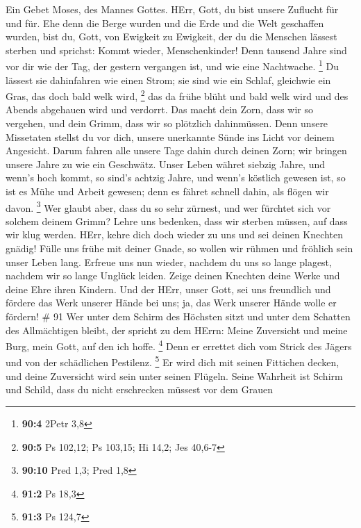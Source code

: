  Ein Gebet Moses, des Mannes Gottes. HErr, Gott, du bist
unsere Zuflucht für und für.  Ehe denn die Berge wurden und
die Erde und die Welt geschaffen wurden, bist du, Gott, von Ewigkeit zu
Ewigkeit,  der du die Menschen lässest sterben und sprichst:
Kommt wieder, Menschenkinder!  Denn tausend Jahre sind vor
dir wie der Tag, der gestern vergangen ist, und wie eine Nachtwache.
\footnote{\textbf{90:4} 2Petr 3,8}  Du lässest sie
dahinfahren wie einen Strom; sie sind wie ein Schlaf, gleichwie ein
Gras, das doch bald welk wird, \footnote{\textbf{90:5} Ps 102,12; Ps
  103,15; Hi 14,2; Jes 40,6-7}  das da frühe blüht und bald
welk wird und des Abends abgehauen wird und verdorrt.  Das
macht dein Zorn, dass wir so vergehen, und dein Grimm, dass wir so
plötzlich dahinmüssen.  Denn unsere Missetaten stellst du
vor dich, unsere unerkannte Sünde ins Licht vor deinem Angesicht.
 Darum fahren alle unsere Tage dahin durch deinen Zorn; wir
bringen unsere Jahre zu wie ein Geschwätz.  Unser Leben
währet siebzig Jahre, und wenn's hoch kommt, so sind's achtzig Jahre,
und wenn's köstlich gewesen ist, so ist es Mühe und Arbeit gewesen; denn
es fähret schnell dahin, als flögen wir davon. \footnote{\textbf{90:10}
  Pred 1,3; Pred 1,8}  Wer glaubt aber, dass du so sehr
zürnest, und wer fürchtet sich vor solchem deinem Grimm? 
Lehre uns bedenken, dass wir sterben müssen, auf dass wir klug werden.
 HErr, kehre dich doch wieder zu uns und sei deinen
Knechten gnädig!  Fülle uns frühe mit deiner Gnade, so
wollen wir rühmen und fröhlich sein unser Leben lang. 
Erfreue uns nun wieder, nachdem du uns so lange plagest, nachdem wir so
lange Unglück leiden.  Zeige deinen Knechten deine Werke
und deine Ehre ihren Kindern.  Und der HErr, unser Gott,
sei uns freundlich und fördere das Werk unserer Hände bei uns; ja, das
Werk unserer Hände wolle er fördern! \# 91  Wer unter dem
Schirm des Höchsten sitzt und unter dem Schatten des Allmächtigen
bleibt,  der spricht zu dem HErrn: Meine Zuversicht und
meine Burg, mein Gott, auf den ich hoffe. \footnote{\textbf{91:2} Ps
  18,3}  Denn er errettet dich vom Strick des Jägers und von
der schädlichen Pestilenz. \footnote{\textbf{91:3} Ps 124,7}
 Er wird dich mit seinen Fittichen decken, und deine
Zuversicht wird sein unter seinen Flügeln. Seine Wahrheit ist Schirm und
Schild,  dass du nicht erschrecken müssest vor dem Grauen
